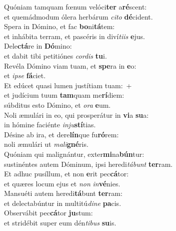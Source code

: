 \evenverse Quóniam tamquam fœnum velóci\textbf{ter} a\textbf{ré}scent:~\*\\
\evenverse et quemádmodum ólera herbárum \textit{ci}\textit{to} \textbf{dé}cident.\\
\oddverse Spera in Dómino, et fac \textbf{bo}ni\textbf{tá}tem:~\*\\
\oddverse et inhábita terram, et pascéris in diví\textit{ti}\textit{is} \textbf{e}jus.\\
\evenverse Dele\textbf{ctá}re in \textbf{Dó}mino:~\*\\
\evenverse et dabit tibi petitiónes \textit{cor}\textit{dis} \textbf{tu}i.\\
\oddverse Revéla Dómino viam tuam, et \textbf{spe}ra in \textbf{e}o:~\*\\
\oddverse et \textit{i}\textit{pse} \textbf{fá}ciet.\\
\evenverse Et edúcet quasi lumen justítiam tuam:~+\\
\evenverse  et judícium tuum \textbf{tam}quam me\textbf{rí}diem:~\*\\
\evenverse súbditus esto Dómino, et \textit{o}\textit{ra} \textbf{e}um.\\
\oddverse Noli æmulári in eo, qui prosperátur in \textbf{vi}a \textbf{su}a:~\*\\
\oddverse in hómine faciénte \textit{in}\textit{ju}\textbf{stí}tias.\\
\evenverse Désine ab ira, et dere\textbf{lín}que fu\textbf{ró}rem:~\*\\
\evenverse noli æmulári ut \textit{ma}\textit{li}\textbf{gné}ris.\\
\oddverse Quóniam qui malignántur, exter\textbf{mi}na\textbf{bún}tur:~\*\\
\oddverse sustinéntes autem Dóminum, ipsi heredi\textit{tá}\textit{bunt} \textbf{ter}ram.\\
\evenverse Et adhuc pusíllum, et non \textbf{e}rit pec\textbf{cá}tor:~\*\\
\evenverse et quæres locum ejus et \textit{non} \textit{in}\textbf{vé}nies.\\
\oddverse Mansuéti autem heredi\textbf{tá}bunt \textbf{ter}ram:~\*\\
\oddverse et delectabúntur in multitú\textit{di}\textit{ne} \textbf{pa}cis.\\
\evenverse Observábit pec\textbf{cá}tor \textbf{ju}stum:~\*\\
\evenverse et stridébit super eum dén\textit{ti}\textit{bus} \textbf{su}is.\\

